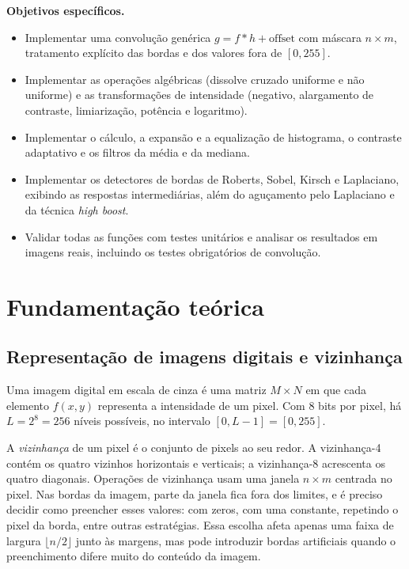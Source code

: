 \documentclass[11pt,a4paper]{article}
\begin{document}
\textbf{Objetivos específicos.}
\begin{itemize}
  \item Implementar uma convolução genérica $g = f*h + \text{offset}$ com máscara $n\times m$, tratamento explícito das bordas e dos valores fora de $[0,255]$.
  \item Implementar as operações algébricas (dissolve cruzado uniforme e não uniforme) e as transformações de intensidade (negativo, alargamento de contraste, limiarização, potência e logaritmo).
  \item Implementar o cálculo, a expansão e a equalização de histograma, o contraste adaptativo e os filtros da média e da mediana.
  \item Implementar os detectores de bordas de Roberts, Sobel, Kirsch e Laplaciano, exibindo as respostas intermediárias, além do aguçamento pelo Laplaciano e da técnica \emph{high boost}.
  \item Validar todas as funções com testes unitários e analisar os resultados em imagens reais, incluindo os testes obrigatórios de convolução.
\end{itemize}

\section{Fundamentação teórica}

\subsection{Representação de imagens digitais e vizinhança}

Uma imagem digital em escala de cinza é uma matriz $M\times N$ em que cada elemento $f(x,y)$ representa a intensidade de um pixel. Com 8 bits por pixel, há $L = 2^8 = 256$ níveis possíveis, no intervalo $[0, L-1] = [0,255]$.

A \emph{vizinhança} de um pixel é o conjunto de pixels ao seu redor. A vizinhança-4 contém os quatro vizinhos horizontais e verticais; a vizinhança-8 acrescenta os quatro diagonais. Operações de vizinhança usam uma janela $n\times m$ centrada no pixel. Nas bordas da imagem, parte da janela fica fora dos limites, e é preciso decidir como preencher esses valores: com zeros, com uma constante, repetindo o pixel da borda, entre outras estratégias. Essa escolha afeta apenas uma faixa de largura $\lfloor n/2 \rfloor$ junto às margens, mas pode introduzir bordas artificiais quando o preenchimento difere muito do conteúdo da imagem.
\end{document}
